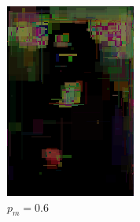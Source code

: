 \begin{figure}[!htb]
\begin{subfigure}[b]{0.3\textwidth}
         \includegraphics[width=\textwidth]{images/mona/1000_300_2/mutation/0_6.png}
         \caption{$p_{m} = 0.6$}
    \end{subfigure}
    \begin{subfigure}[b]{0.3\textwidth}
        \centering
        \label{fig:mutation_0_8}

\end{subfigure}
\end{figure}
